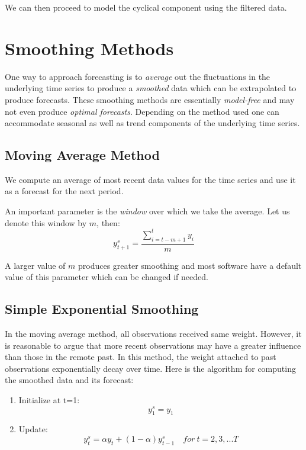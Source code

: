 \documentclass[]{book}
\theoremstyle{definition}
\theoremstyle{definition}
\theoremstyle{definition}
\theoremstyle{remark}
\begin{document}
We can then proceed to model the cyclical component using the filtered
data.

\hypertarget{smoothing-methods}{%
\chapter{Smoothing Methods}\label{smoothing-methods}}

One way to approach forecasting is to \emph{average} out the
fluctuations in the underlying time series to produce a \emph{smoothed}
data which can be extrapolated to produce forecasts. These smoothing
methods are essentially \emph{model-free} and may not even produce
\emph{optimal forecasts}. Depending on the method used one can
accommodate seasonal as well as trend components of the underlying time
series.

\hypertarget{moving-average-method}{%
\section{Moving Average Method}\label{moving-average-method}}

We compute an average of most recent data values for the time series and
use it as a forecast for the next period.

An important parameter is the \emph{window} over which we take the
average. Let us denote this window by \(m\), then: \begin{equation}
    y^s_{t+1}=\frac{\sum \limits_{i=t-m+1}^{t}{y_i}}{m}
    \end{equation}

A larger value of \(m\) produces greater smoothing and most software
have a default value of this parameter which can be changed if needed.

\hypertarget{simple-exponential-smoothing}{%
\section{Simple Exponential
Smoothing}\label{simple-exponential-smoothing}}

In the moving average method, all observations received same weight.
However, it is reasonable to argue that more recent observations may
have a greater influence than those in the remote past. In this method,
the weight attached to past observations exponentially decay over time.
Here is the algorithm for computing the smoothed data and its forecast:

\begin{enumerate}
\def\labelenumi{\arabic{enumi}.}
\item
  Initialize at t=1: \[y_1^s=y_1\]
\item
  Update:
  \[y_{t}^{s}= \alpha y_t + (1-\alpha)y_{t-1}^{s}  \quad for \ t=2,3,...T\]
\end{enumerate}
\end{document}
